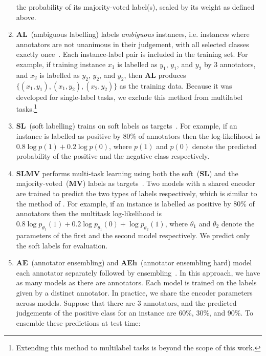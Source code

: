 \documentclass[shortpaper]{clv2025}
\newcommand{\methname}[1]{\textbf{#1}}  %
\begin{document}
\begin{enumerate}
    the probability of its majority-voted label(s), scaled by its weight as
    defined above.
  \item \methname{AL}~(ambiguous labelling) labels \emph{ambiguous} instances,
    i.e. instances where annotators are not unanimous in their judgement, with
    all selected classes exactly once~\citep{gajewska2023}. Each instance-label
    pair is included in the training set. For example, if training instance
    $x_1$ is labelled as $y_1$, $y_1$, and $y_2$ by 3 annotators, and $x_2$ is
    labelled as $y_2$, $y_2$, and $y_2$, then \methname{AL} produces
    $\lbrace(x_1,y_1),(x_1,y_2),(x_2,y_2)\rbrace$ as the training data.
    Because it was developed for single-label tasks, we exclude this method from
    multilabel tasks.\footnote{Extending this method to multilabel tasks is
      beyond the scope of this work.}
  \item \methname{SL}~(soft labelling) trains on soft labels as
    targets~\citep{maity2023,wan2023}. For example, if an instance is labelled
    as positive by 80\% of annotators then the log-likelihood is $0.8\log
    p(1)+0.2\log p(0)$, where $p(1)$ and $p(0)$ denote the predicted probability
    of the positive and the negative class respectively.
  \item \methname{SLMV} performs multi-task learning using both the
    soft~(\methname{SL}) and the majority-voted~(\methname{MV}) labels as
    targets~\citep{grotzinger2023}. Two models with a shared encoder are trained
    to predict the two types of labels respectively, which is similar to the
    method of \citet{fornaciari2021}. For example, if an instance is labelled as
    positive by 80\% of annotators then the multitask log-likelihood is $0.8\log
    p_{\theta_1}(1)+0.2\log p_{\theta_1}(0)+\log p_{\theta_2}(1)$, where
    $\theta_1$ and $\theta_2$ denote the parameters of the first and the second
    model respectively. We predict only the soft labels for evaluation.
  \item \methname{AE}~(annotator ensembling) and \methname{AEh}~(annotator
    ensembling hard) model each annotator separately followed by
    ensembling~\citep{sullivan2023,vitsakis2023}. In this approach, we have as
    many models as there are annotators. Each model is trained on the labels
    given by a distinct annotator. In practice, we share the encoder parameters
    across models. Suppose that there are 3 annotators, and the
    predicted judgements of the positive class for an instance are 60\%, 30\%,
    and 90\%. To ensemble these predictions at test time:

\end{enumerate}
\end{document}
